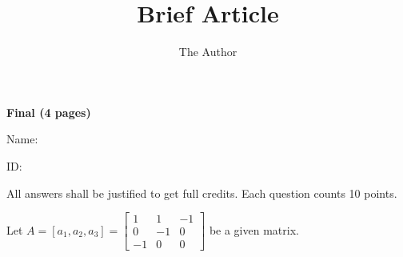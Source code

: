 \documentclass[11pt]{amsart}
\title{Brief Article}
\author{The Author}
\begin{document}


\begin{center}
{\bf Final (4 pages)}
\end{center}

Name: 

ID: 

All answers shall be justified to get full credits. Each question counts 10 points.
\vspace{.2in}


Let 
$A = [a_1, a_2, a_3] = 
\begin{bmatrix}
1 & 1 & -1\\
0 & -1 & 0\\
-1 & 0 & 0 
\end{bmatrix}
$
be a given matrix.

\end{document}
